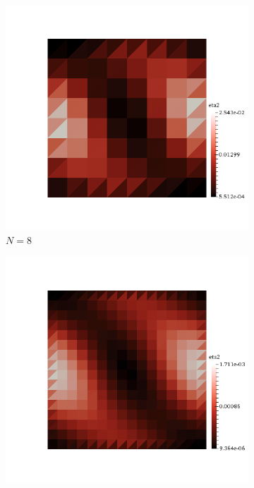 \begin{figure}[h!]
  \centering
  \begin{subfigure}[b]{0.24\textwidth}
    \includegraphics[width=\textwidth,height=\textheight,keepaspectratio,height=\textheight,keepaspectratio]{figures/1_mpet/space/eta2_8.png}
    \caption{$N=8$}
  \end{subfigure}
  \begin{subfigure}[b]{0.24\textwidth}
    \includegraphics[width=\textwidth,height=\textheight,keepaspectratio,height=\textheight,keepaspectratio]{figures/1_mpet/space/eta2_16.png}

\end{subfigure}
\end{figure}
